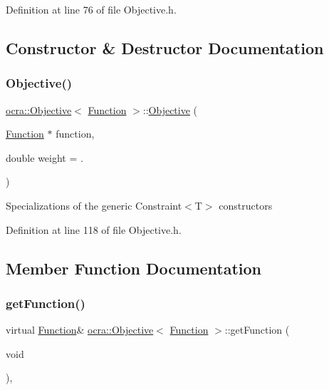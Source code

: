 Definition at line 76 of file Objective.\+h.



\subsection{Constructor \& Destructor Documentation}
\hypertarget{classocra_1_1Objective_3_01Function_01_4_a5a469564d2691823b5e9e951c975b66c}{}\label{classocra_1_1Objective_3_01Function_01_4_a5a469564d2691823b5e9e951c975b66c} 
\subsubsection{\texorpdfstring{Objective()}{Objective()}}
{\footnotesize\ttfamily \hyperlink{classocra_1_1Objective}{ocra\+::\+Objective}$<$ \hyperlink{classocra_1_1Function}{Function} $>$\+::\hyperlink{classocra_1_1Objective}{Objective} (\begin{DoxyParamCaption}\item[{\hyperlink{classocra_1_1Function}{Function} $\ast$}]{function,  }\item[{double}]{weight = {.} }\end{DoxyParamCaption})\hspace{0.3cm}{\ttfamily [inline]}}

Specializations of the generic Constraint$<$\+T$>$ constructors 

Definition at line 118 of file Objective.\+h.



\subsection{Member Function Documentation}
\hypertarget{classocra_1_1Objective_3_01Function_01_4_add81891f4afd477c85ddc326a207e8be}{}\label{classocra_1_1Objective_3_01Function_01_4_add81891f4afd477c85ddc326a207e8be} 
\subsubsection{\texorpdfstring{get\+Function()}{getFunction()}\hspace{0.1cm}{\footnotesize\ttfamily [1/2]}}
{\footnotesize\ttfamily virtual \hyperlink{classocra_1_1Function}{Function}\& \hyperlink{classocra_1_1Objective}{ocra\+::\+Objective}$<$ \hyperlink{classocra_1_1Function}{Function} $>$\+::get\+Function (\begin{DoxyParamCaption}\item[{void}]{ }\end{DoxyParamCaption})\hspace{0.3cm}{\ttfamily [inline]}, {\ttfamily [virtual]}}


